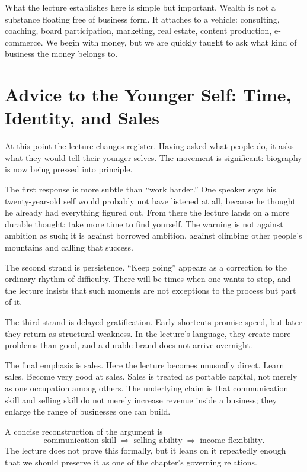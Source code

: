 What the lecture establishes here is simple but important. Wealth is not a substance floating free of business form. It attaches to a vehicle: consulting, coaching, board participation, marketing, real estate, content production, e-commerce. We begin with money, but we are quickly taught to ask what kind of business the money belongs to.

\section{Advice to the Younger Self: Time, Identity, and Sales}

At this point the lecture changes register. Having asked what people do, it asks what they would tell their younger selves. The movement is significant: biography is now being pressed into principle.

The first response is more subtle than ``work harder.'' One speaker says his twenty-year-old self would probably not have listened at all, because he thought he already had everything figured out. From there the lecture lands on a more durable thought: take more time to find yourself. The warning is not against ambition as such; it is against borrowed ambition, against climbing other people's mountains and calling that success.

The second strand is persistence. ``Keep going'' appears as a correction to the ordinary rhythm of difficulty. There will be times when one wants to stop, and the lecture insists that such moments are not exceptions to the process but part of it.

The third strand is delayed gratification. Early shortcuts promise speed, but later they return as structural weakness. In the lecture's language, they create more problems than good, and a durable brand does not arrive overnight.

The final emphasis is sales. Here the lecture becomes unusually direct. Learn sales. Become very good at sales. Sales is treated as portable capital, not merely as one occupation among others. The underlying claim is that communication skill and selling skill do not merely increase revenue inside a business; they enlarge the range of businesses one can build.

A concise reconstruction of the argument is
\begin{equation}
\text{communication skill}
\;\Longrightarrow\;
\text{selling ability}
\;\Longrightarrow\;
\text{income flexibility}.
\end{equation}
The lecture does not prove this formally, but it leans on it repeatedly enough that we should preserve it as one of the chapter's governing relations.

